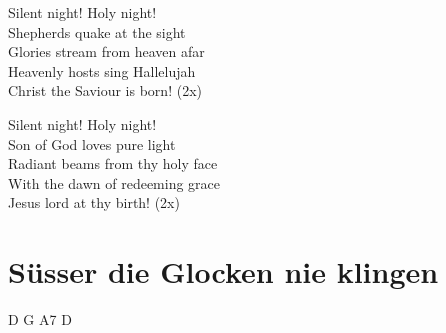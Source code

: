 \documentclass[
  letterpaper,
  twoside=false]{scrbook}
\begin{document}
Silent night! Holy night!\\
Shepherds quake at the sight\\
Glories stream from heaven afar\\
Heavenly hosts sing Hallelujah\\
Christ the Saviour is born! (2x)

Silent night! Holy night!\\
Son of God love\textquotesingle s pure light\\
Radiant beams from thy holy face\\
With the dawn of redeeming grace\\
Jesus lord at thy birth! (2x)

\hypertarget{suxfcsser-die-glocken-nie-klingen}{%
\chapter{Süsser die Glocken nie
klingen}\label{suxfcsser-die-glocken-nie-klingen}}

D G A7 D
\end{document}
